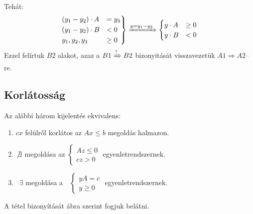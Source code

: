 Tehát:
\[
\begin{rcases}
(y_1 - y_2) \cdot A &= y_3 \\ 
(y_1 - y_2) \cdot B &< 0 \\
y_1, y_2, y_3 &\geq 0
\end{rcases} \xRightarrow{y=y_1-y_2} 
\begin{cases}
y \cdot A &\geq 0 \\ 
y \cdot B &< 0
\end{cases}
\]
Ezzel felírtuk $B2$ alakot, azaz a $B1\xRightarrow{?}B2$ bizonyitását
visszavezetük $A1 \Rightarrow A2$--re.

\subsection{Korlátosság}

Az alábbi három kijelentés ekvivalens:

\begin{enumerate}
  \item $cx$ felülről korlátos az $Ax \leq b$ megoldás halmazon.
  \item $\not \exists$ megoldása az $ \begin{cases}
  Az \leq 0 \\
  cz > 0
  \end{cases} $ egyenletrendszernek.
  \item ~$\exists$ megoldása a~~$\begin{cases}
  yA=c \\
  y \geq 0
  \end{cases}$ egyenletrendszernek.
\end{enumerate}

A tétel bizonyítását  ábra szerint fogjuk belátni.
 

